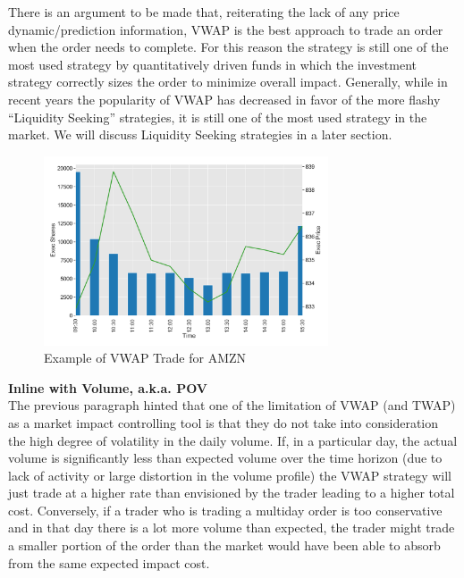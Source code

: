 There is an argument to be made that, reiterating the lack of any price dynamic/prediction information, VWAP is the best approach to trade an order when the order needs to complete. For this reason the strategy is still one of the most used strategy by quantitatively driven funds in which the investment strategy correctly sizes the order to minimize overall impact. Generally, while in recent years the popularity of VWAP has decreased in favor of the more flashy ``Liquidity Seeking'' strategies, it is still one of the most used strategy in the market. We will discuss Liquidity Seeking strategies in a later section. \\


        \begin{figure}[!ht]
        \centering
        \includegraphics[width=0.75\textwidth]{chapters/chapter_exec_models/figures/vwap.png} 
        \caption{Example of VWAP Trade for AMZN\label{fig:vwap}}
        \end{figure}


\noindent\textbf{Inline with Volume, a.k.a. POV} \\


The previous paragraph hinted that one of the limitation of VWAP (and TWAP) as a market impact controlling tool is that they do not take into consideration the high degree of volatility in the daily volume. If, in a particular day, the actual volume is significantly less than expected volume over the time horizon (due to lack of activity or large distortion in the volume profile) the VWAP strategy will just trade at a higher rate than envisioned by the trader leading to a higher total cost. Conversely, if a trader who is trading a multiday order is too conservative and in that day there is a lot more volume than expected, the trader might trade a smaller portion of the order than the market would have been able to absorb from the same expected impact cost.


